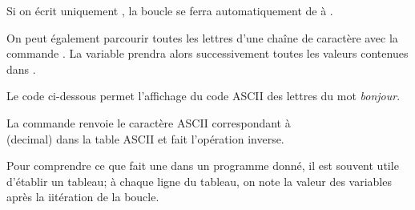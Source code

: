\medskip
\begin{remarques}\setlength{\itemsep}{2mm}
\item Si on écrit uniquement \textbf{}, la boucle se ferra automatiquement de  à .
\item On peut également parcourir toutes les lettres d'une chaîne de caractère avec la commande \textbf{}. La variable \textbf{} prendra alors successivement toutes les valeurs contenues dans \textbf{}.  

\medskip
\begin{exemple}
Le code ci-dessous permet l'affichage du code ASCII des lettres du mot \textit{bonjour}.

\begin{center}
\end{center}
La commande \textbf{} renvoie le caractère ASCII correspondant à \textbf{}\\ (decimal) dans la table ASCII et  \textbf{} fait l'opération inverse.
\end{exemple}

\item Pour comprendre ce que fait une \boup dans un programme donné, il est souvent utile d'établir un tableau; à chaque ligne  du tableau, on note la valeur des variables après la i\eme itération de la boucle.

\end{remarques}
\clearpage


